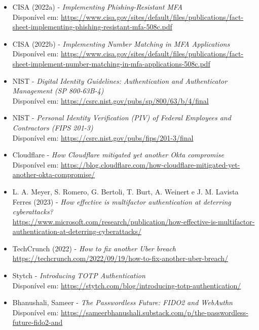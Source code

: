 \begin{itemize}
    \item CISA (2022a) -
    \textit{Implementing Phishing-Resistant MFA}\\[0.01cm]
    Disponível em: \url{https://www.cisa.gov/sites/default/files/publications/fact-sheet-implementing-phishing-resistant-mfa-508c.pdf}

    \item CISA (2022b) -
    \textit{Implementing Number Matching in MFA Applications}\\[0.01cm]
    Disponível em: \url{https://www.cisa.gov/sites/default/files/publications/fact-sheet-implement-number-matching-in-mfa-applications-508c.pdf}

    \item NIST - \textit{Digital Identity Guidelines: Authentication and Authenticator Management (SP 800-63B-4)}\\[0.01cm]
    Disponível em: \url{https://csrc.nist.gov/pubs/sp/800/63/b/4/final}

    \item NIST - \textit{Personal Identity Verification (PIV) of Federal Employees and Contractors (FIPS 201-3)}\\[0.01cm]
    Disponível em: \url{https://csrc.nist.gov/pubs/fips/201-3/final}

    \item Cloudflare - \textit{How Cloudflare mitigated yet another Okta compromise}\\[0.01cm]
    Disponível em: \url{ https://blog.cloudflare.com/how-cloudflare-mitigated-yet-another-okta-compromise/ }

    \item L. A. Meyer, S. Romero, G. Bertoli, T. Burt, A. Weinert e J. M. Lavista Ferres (2023) - \textit{How effective is multifactor authentication at deterring cyberattacks?}\\[0.01cm]
    \url{https://www.microsoft.com/research/publication/how-effective-is-multifactor-authentication-at-deterring-cyberattacks/}
 
    \item TechCrunch (2022) -
    \textit{How to fix another Uber breach}\\[0.01cm]
    \url{https://techcrunch.com/2022/09/19/how-to-fix-another-uber-breach/}

    \item Stytch - \textit{Introducing TOTP Authentication}\\[0.01cm]
    Disponível em: \url{https://stytch.com/blog/introducing-totp-authentication/}

    \item Bhanushali, Sameer - \textit{The Passwordless Future: FIDO2 and WebAuthn}\\[0.01cm]
    Disponível em: \url{https://sameerbhanushali.substack.com/p/the-passwordless-future-fido2-and}

\end{itemize}